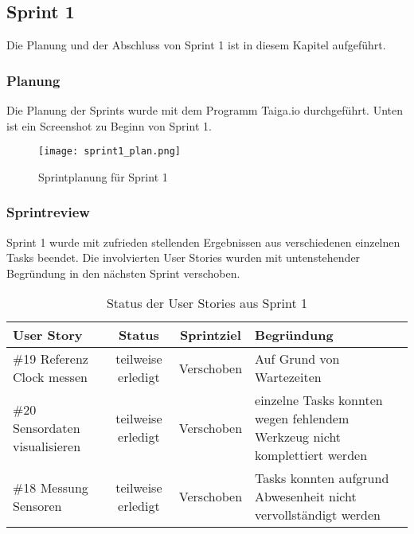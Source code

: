 \subsection*{Sprint 1}
Die Planung und der Abschluss von Sprint 1 ist in diesem Kapitel aufgeführt.
\subsubsection*{Planung}
Die Planung der Sprints wurde mit dem Programm Taiga.io durchgeführt. Unten ist ein Screenshot zu Beginn von Sprint 1.
    \begin{figure}[H]
        \centering
        \texttt{[image: sprint1\_plan.png]}
        \caption{Sprintplanung für Sprint 1}
    \end{figure}
\subsubsection*{Sprintreview}
    Sprint 1 wurde mit zufrieden stellenden Ergebnissen aus verschiedenen einzelnen Tasks beendet. Die involvierten User Stories wurden mit untenstehender Begründung in den nächsten Sprint verschoben.
    \begin{table}[H]
        \centering
        \begin{tabular}{lccp{7cm}}
            \textbf{User Story} &  \textbf{Status} & \textbf{Sprintziel}& \textbf{Begründung}\\\toprule[2pt]
            \#19 Referenz Clock messen & teilweise erledigt & Verschoben & Auf Grund von Wartezeiten\\
            \#20 Sensordaten visualisieren & teilweise erledigt & Verschoben & einzelne Tasks konnten wegen fehlendem Werkzeug nicht komplettiert werden\\
            \#18 Messung Sensoren & teilweise erledigt & Verschoben & Tasks konnten aufgrund Abwesenheit nicht vervollständigt werden\\
        \end{tabular}
        \caption{Status der User Stories aus Sprint 1}
    \end{table}